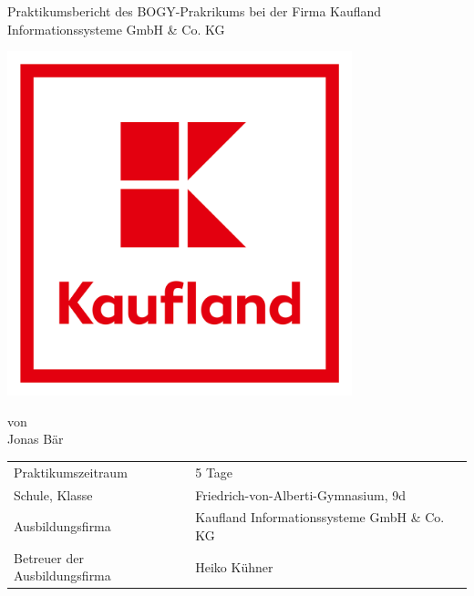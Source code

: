 \def\title{Praktikumsbericht des BOGY-Prakrikums bei der Firma Kaufland Informationssysteme GmbH \& Co. KG}
\def\author{Jonas Bär}

\begin{titlepage}

\vspace{10mm}

\begin{center}
    \vspace{5mm}
	
	\huge \title{}
	
	\vspace{42.6pt}

	\includegraphics[width=10cm]{include/images/Kaufland.png}

	\vspace{20.6pt}
	
	\small von \\
	\large \author{}
\end{center}

\vspace{40.6pt}

\begin{table}[h]
    \centering
    \begin{tabular}{ll}
        \small Praktikumszeitraum               & 5 Tage                                      \\
        \small Schule, Klasse                   & Friedrich-von-Alberti-Gymnasium, 9d         \\
        \small Ausbildungsfirma                 & Kaufland Informationssysteme GmbH \& Co. KG \\
        \small Betreuer der Ausbildungsfirma    & Heiko Kühner      						  \\
    \end{tabular}
\end{table}

\vspace{20.7pt}



\end{titlepage}